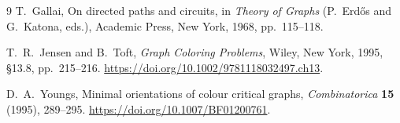 \documentclass[11pt]{amsart}
\begin{document}
\begin{thebibliography}{9}
T.~Gallai, On directed paths and circuits, in \emph{Theory of Graphs}
(P.~Erd\H{o}s and G.~Katona, eds.), Academic Press, New York, 1968,
pp.~115--118.

T.~R.~Jensen and B.~Toft, \emph{Graph Coloring Problems}, Wiley,
New York, 1995, \S13.8, pp.~215--216.
\url{https://doi.org/10.1002/9781118032497.ch13}.

D.~A.~Youngs, Minimal orientations of colour critical graphs,
\emph{Combinatorica} \textbf{15} (1995), 289--295.
\url{https://doi.org/10.1007/BF01200761}.
\end{thebibliography}
\end{document}
